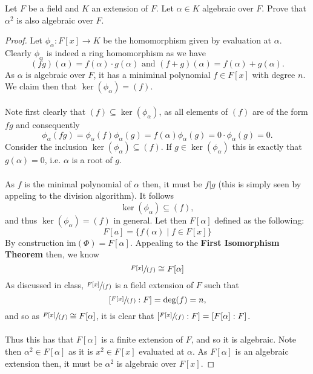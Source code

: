 \documentclass[12pt]{article}
\newenvironment{ex}[2][Exercise]{\begin{trivlist}
\item[\hskip \labelsep {\bfseries #1}\hskip \labelsep {\bfseries #2.}]}{\end{trivlist}}
\begin{document}
\begin{ex}{4}
    Let $F$ be a field and $K$ an extension of $F$. Let $\alpha \in K$ algebraic over $F$. Prove that $\alpha^2$ is also algebraic over $F$. 
    \begin{proof}
        Let $\phi_\alpha : F[x] \rightarrow K$ be the homomorphism given by evaluation at $\alpha$. Clearly $\phi_\alpha$ is indeed a ring homomorphism as we have 
        $$(fg)(\alpha) = f(\alpha) \cdot g(\alpha) \text{ and } (f + g)(\alpha) = f(\alpha) + g(\alpha).$$
        As $\alpha$ is algebraic over $F$, it has a miniminal polynomial $f \in F[x]$ with degree $n$. We claim then that $\ker(\phi_\alpha) = (f)$. \\ \\
        Note first clearly that $(f) \subseteq \ker(\phi_\alpha)$, as all elements of $(f)$ are of the form $fg$ and consequently
        $$\phi_\alpha(fg) = \phi_\alpha(f)\phi_\alpha(g) = f(\alpha)\phi_\alpha(g) = 0 \cdot \phi_\alpha(g) = 0.$$
        Consider the inclusion $\ker(\phi_\alpha) \subseteq (f)$. If $g \in \ker(\phi_\alpha)$ this is exactly that $g(\alpha) = 0$, i.e. $\alpha$ is a root of $g$. \\ \\
        As $f$ is the minimal polynomial of $\alpha$ then, it must be $f | g$ (this is simply seen by appeling to the division algorithm). It follows 
        $$\ker(\phi_\alpha) \subseteq (f),$$
        and thus $\ker(\phi_\alpha) = (f)$ in general. Let then $F[\alpha]$ defined as the following:
        $$F[a] = \{f(\alpha) \; | \; f \in F[x]\}$$
        By construction $\text{im}(\Phi) = F[\alpha]$. Appealing to the \textbf{First Isomorphism Theorem} then, we know
        $$\sfrac{F[x]}{(f)} \cong F[\alpha]$$
        As discussed in class, $\sfrac{F[x]}{(f)}$ is a field extension of $F$ such that 
        $$[\sfrac{F[x]}{(f)} : F] = \text{deg}(f) = n,$$
        and so as $\sfrac{F[x]}{(f)} \cong F[\alpha]$, it is clear that $[\sfrac{F[x]}{(f)} : F] = [F[\alpha] : F]$. 
        \\ \\
        Thus this has that $F[\alpha]$ is a finite extension of $F$, and so it is algebraic. Note then $\alpha^2 \in F[\alpha]$ as it is $x^2 \in F[x]$ evaluated at $\alpha$. As $F[\alpha]$ is an algebraic extension then, it must be $\alpha^2$ is algebraic over $F[x]$.

    \end{proof}
\end{ex}
\end{document}

